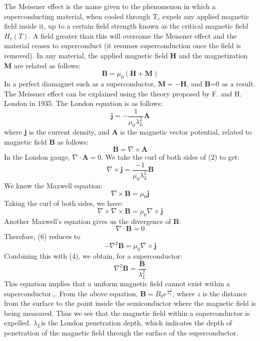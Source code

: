 \documentclass[aps,prl,twocolumn,groupedaddress]{revtex4}
\begin{document}
The Meissner effect is the name given to the phenomenon in which a superconducting material, when cooled through T$_{c}$ expels any applied magnetic field inside it, up to a certain field strength known as the critical magnetic field $H_{c}(T)$. A field greater than this will overcome the Meissner effect and the material ceases to superconduct (it resumes superconduction once the field is removed). In any material, the applied magnetic field \textbf{H} and the magnetization \textbf{M} are related as follows:
\begin{equation}
\mathbf{B}=\mu_{0}(\mathbf{H+M})
\end{equation}
In a perfect diamagnet such as a superconductor, $\mathbf{M=-H}$, and \textbf{B}=0 as a result. The Meissner effect can be explained using the theory proposed by F. and H. London in 1935\cite{london}. The London equation is as follows:
\begin{equation}
\mathbf{j}=-\frac{1}{\mu_{0}\lambda_{L}^{2}}\mathbf{A}
\end{equation}
where \textbf{j} is the current density, and \textbf{A} is the magnetic vector potential, related to magnetic field \textbf{B} as follows:
\begin{equation}
\mathbf{B}=\nabla\times\mathbf{A}
\end{equation}
In the London gauge, $\nabla\cdot\mathbf{A}=0$. We take the curl of both sides of (2) to get:
\begin{equation}
\nabla\times\mathbf{j}=\frac{-1}{\mu_{0}\lambda_{L}^{2}}\mathbf{B}
\end{equation}
We know the Maxwell equation:
\begin{equation}
\nabla\times\mathbf{B}=\mu_{0}\mathbf{j}
\end{equation}
Taking the curl of both sides, we have:
\begin{equation}
\nabla\times\nabla\times\mathbf{B}=\mu_{0}\nabla\times\mathbf{j}
\end{equation}
Another Maxwell's equation gives us the divergence of \textbf{B}:
\begin{equation}
\nabla\cdot\mathbf{B}=0
\end{equation}
Therefore, (6) reduces to
\begin{equation}
-\nabla^{2}\mathbf{B}=\mu_{0}\nabla\times\mathbf{j}
\end{equation}
Combining this with (4), we obtain, for a superconductor:
\begin{equation}
\nabla^{2}\mathbf{B}=\frac{\mathbf{B}}{\lambda_{L}^{2}}
\end{equation}
This equation implies that a uniform magnetic field cannot exist within a superconductor.\cite{sheahen},\cite{kittel}. From the above equation, $\mathbf{B}=B_{0}e^{\frac{-z}{\lambda_{L}}}$, where $z$ is the distance from the surface to the point inside the semiconductor where the magnetic field is being measured. Thus we see that the magnetic field within a superconductor is expelled. $\lambda_{L}$is the London penetration depth, which indicates the depth of penetration of the magnetic field through the surface of the superconductor.
\end{document}
